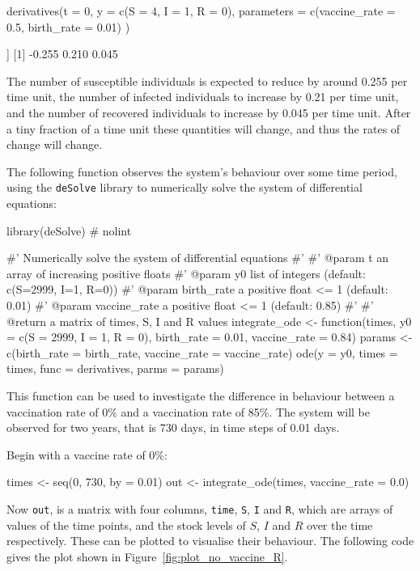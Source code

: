 \begin{Rin}
derivatives(t = 0,
            y = c(S = 4, I = 1, R = 0),
            parameters = c(vaccine_rate = 0.5,
                           birth_rate = 0.01)
)
\end{Rin}

\begin{Rout}
[[1]]
[1] -0.255  0.210  0.045

\end{Rout}

The number of susceptible individuals is expected to reduce by around 0.255 per
time unit, the number of infected individuals to increase by 0.21 per time unit,
and the number of recovered individuals to increase by 0.045 per time unit.
After a tiny fraction of a time unit these quantities will change, and thus the
rates of change will change.

The following function observes the system's behaviour over some time period,
using the \texttt{deSolve} library to numerically solve the system of
differential equations:

\begin{Rin}
library(deSolve)  # nolint

#' Numerically solve the system of differential equations
#'
#' @param t an array of increasing positive floats
#' @param y0 list of integers (default: c(S=2999, I=1, R=0))
#' @param birth_rate a positive float <= 1 (default: 0.01)
#' @param vaccine_rate a positive float <= 1 (default: 0.85)
#'
#' @return a matrix of times, S, I and R values
integrate_ode <- function(times,
                          y0 = c(S = 2999, I = 1, R = 0),
                          birth_rate = 0.01,
                          vaccine_rate = 0.84){
  params <- c(birth_rate = birth_rate,
                  vaccine_rate = vaccine_rate)
  ode(y = y0,
      times = times,
      func = derivatives,
      parms = params)
}
\end{Rin}

This function can be used to investigate the difference in behaviour between
a vaccination rate of 0\% and a vaccination rate of 85\%. The system will be
observed for two years, that is 730 days, in time steps of 0.01 days.

Begin with a vaccine rate of 0\%:

\begin{Rin}
times <- seq(0, 730, by = 0.01)
out <- integrate_ode(times, vaccine_rate = 0.0)
\end{Rin}

Now \texttt{out}, is a matrix with four columns,  \texttt{time},
\texttt{S}, \texttt{I} and \texttt{R}, which are arrays of
values of the time points, and the stock levels of $S$, $I$ and $R$ over the
time respectively.
These can be plotted to visualise their behaviour.
The following code gives the plot shown in Figure~\ref{fig:plot_no_vaccine_R}.

